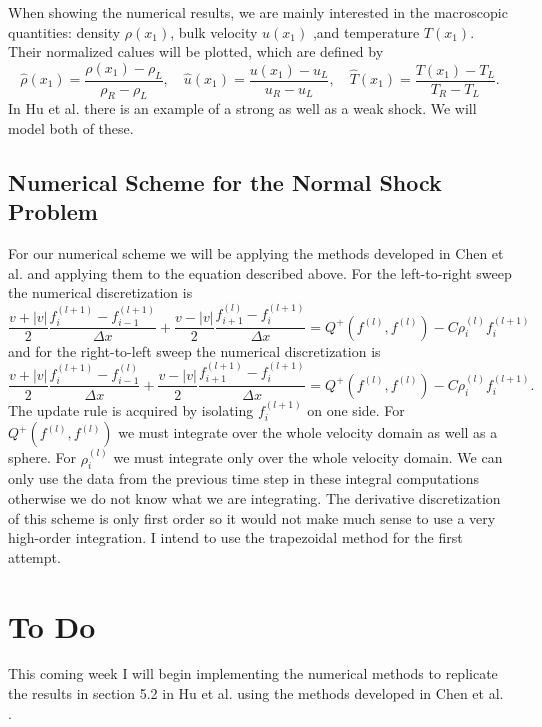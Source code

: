 \documentclass{article}
\begin{document}
When showing the numerical results, we are mainly interested in the macroscopic quantities: density $\rho(x_1)$, bulk  velocity $u(x_1)$ ,and temperature $T(x_1)$. Their normalized calues will be plotted, which are defined by
\[
    \hat \rho(x_1) = \frac{\rho(x_1) - \rho_L}{\rho_R - \rho_L}, \quad
    \hat u(x_1) = \frac{u(x_1) - u_L}{u_R - u_L}, \quad
    \hat T(x_1) = \frac{T(x_1) - T_L}{T_R - T_L}.
\]
In Hu et al. \cite{hu2021adaptive} there is an example of a strong as well as a weak shock. We will model both of these.
\subsection{Numerical Scheme for the Normal Shock Problem}
For our numerical scheme we will be applying the methods developed in Chen et al. \cite{CHEN2013452} and applying them to the equation described above. For the left-to-right sweep the numerical discretization is 
\[
    \frac{v + |v|}{2} \frac{f_i^{(l+1)} - f_{i-1}^{(l+1)}}{\Delta x} + \frac{v - |v|}{2} \frac{f_{i+1}^{(l)} - f_i^{(l+1)}}{\Delta x} = Q^+(f^{(l)}, f^{(l)}) - C \rho_i^{(l)} f_i^{(l+1)}
\]
and for the right-to-left sweep the numerical discretization is
\[
    \frac{v + |v|}{2} \frac{f_i^{(l+1)} - f_{i-1}^{(l)}}{\Delta x} + \frac{v - |v|}{2} \frac{f_{i+1}^{(l+1)} - f_i^{(l+1)}}{\Delta x} = Q^+(f^{(l)}, f^{(l)}) - C \rho_i^{(l)} f_i^{(l+1)}.
\]
The update rule is acquired by isolating $f_i^{(l+1)}$ on one side. For $Q^+(f^{(l)}, f^{(l)})$ we must integrate over the whole velocity domain as well as a sphere. For $\rho_i^{(l)}$ we must integrate only over the whole velocity domain. We can only use the data from the previous time step in these integral computations otherwise we do not know what we are integrating. The derivative discretization of this scheme is only first order so it would not make much sense to use a very high-order integration. I intend to use the trapezoidal method for the first attempt.
\section{To Do}
This coming week I will begin implementing the numerical methods to replicate the results in section 5.2 in Hu et al. \cite{hu2021adaptive} using the methods developed in Chen et al. \cite{CHEN2013452}.


\end{document}
